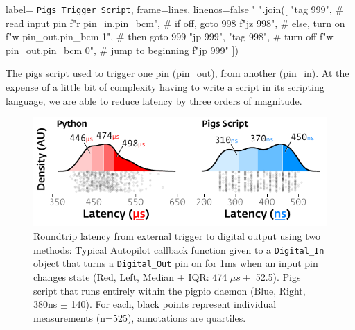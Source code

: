 \begin{marginfigure}[-10cm]
\begin{pythoncode*}{
label= \texttt{Pigs Trigger Script},
frame=lines,
linenos=false}
" ".join([
  "tag 999",
  # read input pin
  f"r {pin_in.pin_bcm}",
  # if off, goto 998
  f"jz 998", 
  # else, turn on
  f"w {pin_out.pin_bcm} 1",
  # then goto 999
  "jp 999", 
  "tag 998",
  # turn off
  f"w {pin_out.pin_bcm} 0",
  # jump to beginning
  f"jp 999"
])
\end{pythoncode*}
\caption{The pigs script used to trigger one pin (pin\_out), from another (pin\_in). At the expense of a little bit of complexity having to write a script in its scripting language, we are able to reduce latency by three orders of magnitude.}
\label{fig:pigsscript}
\end{marginfigure}


\begin{figure}[hb!]
\caption{Roundtrip latency from external trigger to digital output using two methods: Typical Autopilot callback function given to a \texttt{Digital\_In} object that turns a \texttt{Digital\_Out} pin on for 1ms when an input pin changes state (Red, Left, Median $\pm$ IQR: 474 $\mu s \pm$ 52.5). Pigs script that runs entirely within the pigpio daemon (Blue, Right, 380ns $\pm$ 140). For each, black points represent individual measurements (n=525), annotations are quartiles.}
\label{fig:gpiort}
\includegraphics{figures/gpio_roundtrip_density.pdf}
\end{figure}

\clearpage


